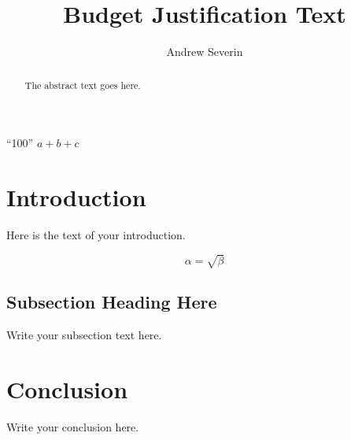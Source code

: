 \documentclass{article}
\newcommand{\testvariable}{100}
\begin{document}
\title{Budget Justification Text}
\author{Andrew Severin}

\maketitle

``\testvariable''
$a + b + c$

\begin{abstract}
The abstract text goes here.
\end{abstract}

\section{Introduction}
Here is the text of your introduction.

%

\begin{equation}
    \label{simple_equation}
    \alpha = \sqrt{ \beta }
\end{equation}

\subsection{Subsection Heading Here}
Write your subsection text here.


\section{Conclusion}
Write your conclusion here.
\end{document}
